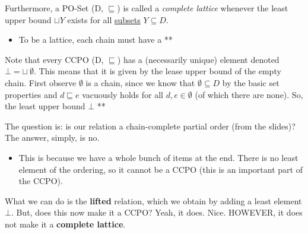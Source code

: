 \documentclass[11pt,a4paper,titlepage,dvipsnames,cmyk]{scrartcl}
\begin{document}
Furthermore, a PO-Set (D, $\sqsubseteq$) is called a \textit{complete
lattice} whenever the least upper bound $\sqcup Y$ exists for all
\underline{subsets} $Y\subseteq D$.
\begin{itemize}
    \item To be a lattice, each chain must have a ** %
\end{itemize}

Note that every CCPO (D, $\sqsubseteq$) has a (necessarily unique) element
denoted $\bot = \sqcup \ \emptyset$. This means that it is given by the
lease upper bound of the empty chain. First observe $\emptyset$ is a
chain, since we know that $\emptyset \subseteq D$ by the basic set
properties and $d \sqsubseteq e$ vacuously holds for all $d,e \in
\emptyset$ (of which there are none). So, the least upper bound $\bot$ **

The question is: is our relation a chain-complete partial order (from the
slides)? The answer, simply, is no.
\begin{itemize}
    \item This is because we have a whole bunch of items at the end. There
        is no least element of the ordering, so it cannot be a CCPO (this
        is an important part of the CCPO).
\end{itemize}

What we can do is the \textbf{lifted} relation, which we obtain by adding
a least element $\bot$. But, does this now make it a CCPO? Yeah, it does.
Nice. HOWEVER, it does not make it a \textbf{complete lattice}.
\end{document}
